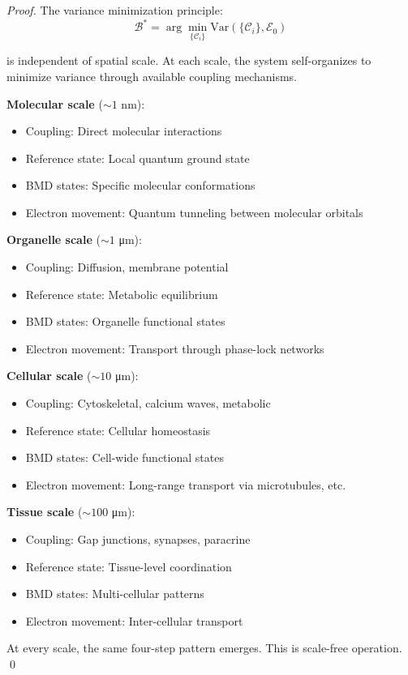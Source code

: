 \documentclass[12pt,a4paper]{article}
\begin{document}
\begin{proof}
The variance minimization principle:
\begin{equation}
\mathcal{B}^* = \arg\min_{\{\mathcal{C}_i\}} \text{Var}(\{\mathcal{C}_i\}, \mathcal{E}_0)
\end{equation}

is independent of spatial scale. At each scale, the system self-organizes to minimize variance through available coupling mechanisms.

\textbf{Molecular scale} ($\sim 1$ nm):
\begin{itemize}
\item Coupling: Direct molecular interactions
\item Reference state: Local quantum ground state
\item BMD states: Specific molecular conformations
\item Electron movement: Quantum tunneling between molecular orbitals
\end{itemize}

\textbf{Organelle scale} ($\sim 1$ μm):
\begin{itemize}
\item Coupling: Diffusion, membrane potential
\item Reference state: Metabolic equilibrium
\item BMD states: Organelle functional states
\item Electron movement: Transport through phase-lock networks
\end{itemize}

\textbf{Cellular scale} ($\sim 10$ μm):
\begin{itemize}
\item Coupling: Cytoskeletal, calcium waves, metabolic
\item Reference state: Cellular homeostasis
\item BMD states: Cell-wide functional states
\item Electron movement: Long-range transport via microtubules, etc.
\end{itemize}

\textbf{Tissue scale} ($\sim 100$ μm):
\begin{itemize}
\item Coupling: Gap junctions, synapses, paracrine
\item Reference state: Tissue-level coordination
\item BMD states: Multi-cellular patterns
\item Electron movement: Inter-cellular transport
\end{itemize}

At every scale, the same four-step pattern emerges. This is scale-free operation. \qed
\end{proof}
\end{document}
